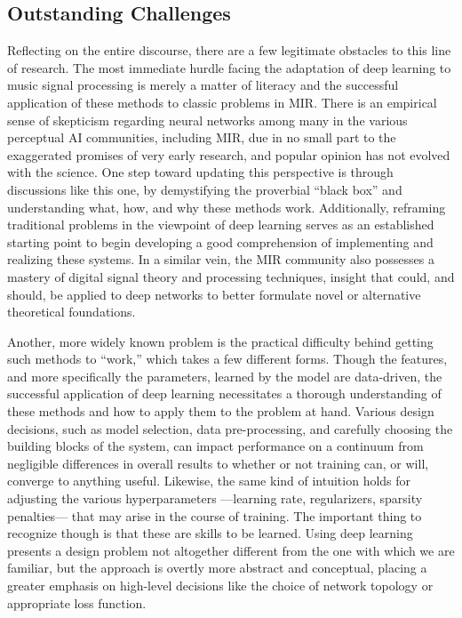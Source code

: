 \subsection{Outstanding Challenges}

Reflecting on the entire discourse, there are a few legitimate obstacles to this line of research.
The most immediate hurdle facing the adaptation of deep learning to music signal processing is merely a matter of literacy and the successful application of these methods to classic problems in MIR.
There is an empirical sense of skepticism regarding neural networks among many in the various perceptual AI communities, including MIR, due in no small part to the exaggerated promises of very early research, and popular opinion has not evolved with the science.
One step toward updating this perspective is through discussions like this one, by demystifying the proverbial ``black box'' and understanding what, how, and why these methods work.
Additionally, reframing traditional problems in the viewpoint of deep learning serves as an established starting point to begin developing a good comprehension of implementing and realizing these systems.
In a similar vein, the MIR community also possesses a mastery of digital signal theory and processing techniques, insight that could, and should, be applied to deep networks to better formulate novel or alternative theoretical foundations.

Another, more widely known problem is the practical difficulty behind getting such methods to ``work,'' which takes a few different forms.
Though the features, and more specifically the parameters, learned by the model are data-driven, the successful application of deep learning necessitates a thorough understanding of these methods and how to apply them to the problem at hand.
Various design decisions, such as model selection, data pre-processing, and carefully choosing the building blocks of the system, can impact performance on a continuum from negligible differences in overall results to whether or not training can, or will, converge to anything useful.
Likewise, the same kind of intuition holds for adjusting the various hyperparameters ---learning rate, regularizers, sparsity penalties--- that may arise in the course of training.
The important thing to recognize though is that these are skills to be learned.
Using deep learning presents a design problem not altogether different from the one with which we are familiar, but the approach is overtly more abstract and conceptual, placing a greater emphasis on high-level decisions like the choice of network topology or appropriate loss function.

